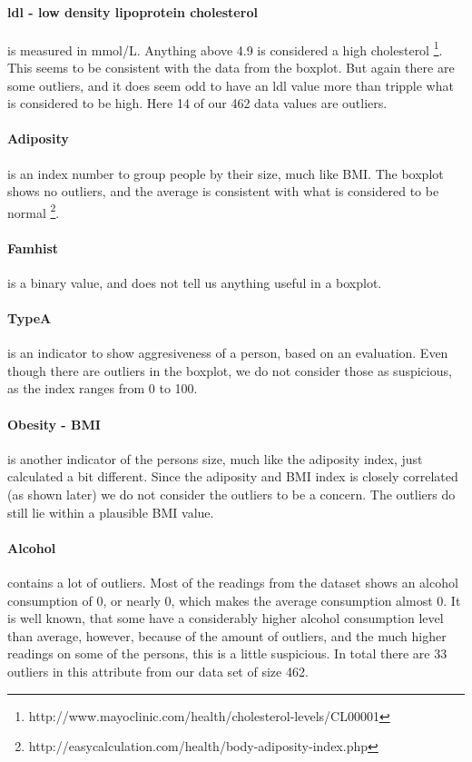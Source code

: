\paragraph{ldl - low density lipoprotein cholesterol} is measured in mmol/L. Anything above 4.9 is considered a high cholesterol \footnote{http://www.mayoclinic.com/health/cholesterol-levels/CL00001}. This seems to be consistent with the data from the boxplot. But again there are some outliers, and it does seem odd to have an ldl value more than tripple what is considered to be high.
Here 14 of our 462 data values are outliers.%

\paragraph{Adiposity} is an index number to group people by their size, much like BMI. The boxplot shows no outliers, and the average is consistent with what is considered to be normal \footnote{http://easycalculation.com/health/body-adiposity-index.php}.

\paragraph{Famhist} is a binary value, and does not tell us anything useful in a boxplot.%

\paragraph{TypeA} is an indicator to show aggresiveness of a person, based on an evaluation. Even though there are outliers in the boxplot, we do not consider those as suspicious, as the index ranges from 0 to 100.

\paragraph{Obesity - BMI} is another indicator of the persons size, much like the adiposity index, just calculated a bit different. Since the adiposity and BMI index is closely correlated (as shown later) we do not consider the outliers to be a concern. The outliers do still lie within a plausible BMI value.

\paragraph{Alcohol} contains a lot of outliers. Most of the readings from the dataset shows an alcohol consumption of 0, or nearly 0, which makes the average consumption almost 0. It is well known, that some have a considerably higher alcohol consumption level than average, however, because of the amount of outliers, and the much higher readings on some of the persons, this is a little suspicious.
In total there are 33 outliers in this attribute from our data set of size 462.

